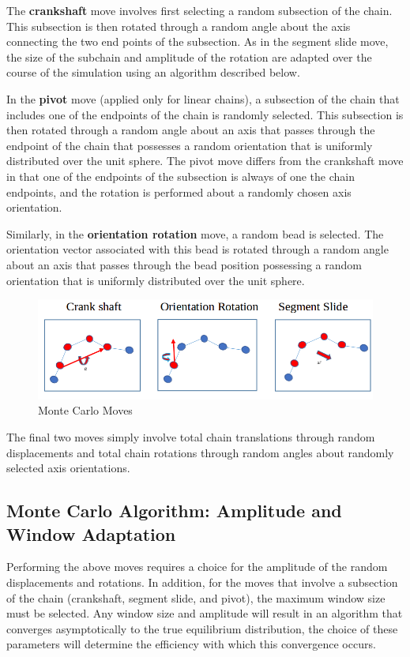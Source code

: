 \documentclass[english]{article}
\begin{document}
The \textbf{crankshaft} move involves first selecting a random subsection of the chain. This subsection is then rotated through a random angle about the axis connecting the two end points of the subsection. As in the segment slide move, the size of the subchain and amplitude of the rotation are adapted over the course of the simulation using an algorithm described below.

In the \textbf{pivot} move (applied only for linear chains), a subsection of the chain that includes one of the endpoints of the chain is randomly selected. This subsection is then rotated through a random angle about an axis that passes through the endpoint of the chain that possesses a random orientation that is uniformly distributed over the unit sphere. The pivot move differs from the crankshaft move in that one of the endpoints of the subsection is always of one the chain endpoints, and the rotation is performed about a randomly chosen axis orientation.

Similarly, in the \textbf{orientation rotation} move, a random bead is selected. The orientation vector associated with this bead is rotated through a random angle about an axis that passes through the bead position possessing a random orientation that is uniformly distributed over the unit sphere.

\begin{figure}[h]
\centering
\caption{Monte Carlo Moves}

\includegraphics[scale=0.3]{figures/mcmoves.png}

\end{figure}

The final two moves simply involve total chain translations through random displacements and total chain rotations through random angles about randomly selected axis orientations.

\subsection{Monte Carlo Algorithm: Amplitude and Window Adaptation}

Performing the above moves requires a choice for the amplitude of the random displacements and rotations. In addition, for the moves that involve a subsection of the chain (crankshaft, segment slide, and pivot), the maximum window size must be selected. Any window size and amplitude will result in an algorithm that converges asymptotically to the true equilibrium distribution, the choice of these parameters will determine the efficiency with which this convergence occurs.
\end{document}
